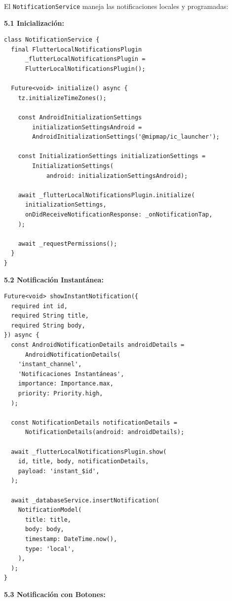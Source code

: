 \documentclass[12pt,a4paper]{article}
\begin{document}
El \texttt{NotificationService} maneja las notificaciones locales y programadas:

\textbf{5.1 Inicialización:}

\begin{verbatim}
class NotificationService {
  final FlutterLocalNotificationsPlugin 
      _flutterLocalNotificationsPlugin =
      FlutterLocalNotificationsPlugin();

  Future<void> initialize() async {
    tz.initializeTimeZones();

    const AndroidInitializationSettings 
        initializationSettingsAndroid =
        AndroidInitializationSettings('@mipmap/ic_launcher');

    const InitializationSettings initializationSettings =
        InitializationSettings(
            android: initializationSettingsAndroid);

    await _flutterLocalNotificationsPlugin.initialize(
      initializationSettings,
      onDidReceiveNotificationResponse: _onNotificationTap,
    );

    await _requestPermissions();
  }
}
\end{verbatim}

\textbf{5.2 Notificación Instantánea:}

\begin{verbatim}
Future<void> showInstantNotification({
  required int id,
  required String title,
  required String body,
}) async {
  const AndroidNotificationDetails androidDetails =
      AndroidNotificationDetails(
    'instant_channel',
    'Notificaciones Instantáneas',
    importance: Importance.max,
    priority: Priority.high,
  );

  const NotificationDetails notificationDetails =
      NotificationDetails(android: androidDetails);

  await _flutterLocalNotificationsPlugin.show(
    id, title, body, notificationDetails,
    payload: 'instant_$id',
  );

  await _databaseService.insertNotification(
    NotificationModel(
      title: title,
      body: body,
      timestamp: DateTime.now(),
      type: 'local',
    ),
  );
}
\end{verbatim}

\newpage

\textbf{5.3 Notificación con Botones:}
\end{document}
